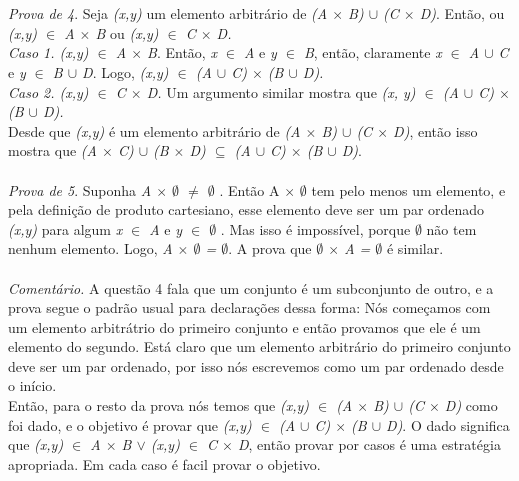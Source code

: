 \\
\\
\textit{Prova de 4}. Seja \textit{(x,y)} um elemento arbitrário de \textit{(A $\times$ B) $\cup$ (C $\times$ D)}. Então, ou
\textit{(x,y) $\in$ A $\times$ B} ou \textit{(x,y) $\in$ C $\times$ D.}
\\
\textit{	Caso 1. (x,y) $\in$ A $\times$ B}. Então, \textit{x $\in$ A} e \textit{y $\in$ B}, então, claramente \textit{x $\in$ A $\cup$
C} e \textit{y $\in$ B $\cup$ D}. Logo, \textit{(x,y) $\in$ (A $\cup$ C) $\times$ (B $\cup$ D).}
\\
\textit{	Caso 2. (x,y) $\in$ C $\times$ D.} Um argumento similar mostra que \textit{(x, y) $\in$ (A $\cup$ C) $\times$ 
  (B $\cup$ D).}
\\
  Desde que \textit{(x,y)} é um elemento arbitrário de \textit{(A $\times$ B) $\cup$ (C $\times$ D)}, então isso mostra que \textit{(A $\times$ C) $\cup$ (B $\times$ D) $\subseteq$ (A $\cup$ C) $\times$ (B $\cup$ D)}.
\\
\\
\textit{Prova de 5}. Suponha \textit{A $\times$  $\emptyset$  $\neq$  $\emptyset$ }. Então A $\times$  $\emptyset$  tem pelo menos um elemento, e pela definição de produto cartesiano, esse elemento deve ser um par ordenado \textit{(x,y)} para algum \textit{x $\in$ A} e \textit{y $\in$ $\emptyset$ }. Mas isso é impossível, porque $\emptyset$ não tem nenhum elemento. Logo, \textit{A $\times$ $\emptyset$  = $\emptyset$}. A prova que \textit{$\emptyset$   $\times$  A =  $\emptyset$} é similar.
\\
\\
\textit{Comentário.} A questão 4 fala que um conjunto é um subconjunto de outro, e a prova segue o padrão usual para declarações dessa forma: Nós começamos com um elemento arbitrátrio do primeiro conjunto e então provamos que ele é um elemento do segundo. Está claro que um elemento arbitrário do primeiro conjunto deve ser um par ordenado, por isso nós escrevemos como um par ordenado desde o início.
\\      
\indent	 Então, para o resto da prova nós temos que  \textit{(x,y) $\in$  (A $\times$ B) $\cup$ (C $\times$ D)} como foi dado, e o objetivo é provar que \textit{(x,y) $\in$  (A $\cup$ C) $\times$ (B $\cup$ D)}. O dado significa que \textit{(x,y) $\in$ A $\times$ B $\vee$ (x,y) $\in$  C $\times$ D}, então provar por casos é uma estratégia apropriada. Em cada caso é facil provar o objetivo. 
\\
